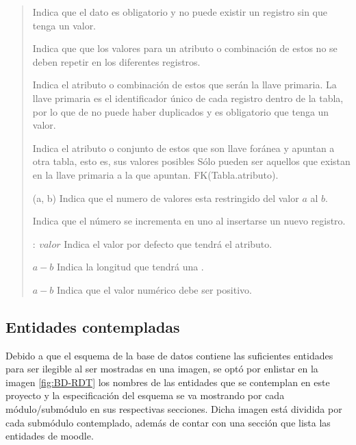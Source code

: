     \begin{quote}
    \begin{bGlosario}

            Indica que el dato es obligatorio y no puede existir un registro sin que tenga
            un valor.

            Indica que que los valores para un atributo o combinación de estos no se deben
            repetir en los diferentes registros.

            Indica el atributo o combinación de estos que serán la llave primaria. La llave
            primaria es el identificador único de cada registro dentro de la tabla, por lo
            que de no puede haber duplicados y es obligatorio que tenga un valor.

            Indica el atributo o conjunto de estos que son llave foránea y apuntan a otra
            tabla, esto es, sus valores posibles Sólo pueden ser aquellos que existan en la
            llave primaria a la que apuntan. FK(Tabla.atributo).

        (a, b)
            Indica que el numero de valores esta restringido del valor $a$ al $b$.

            Indica que el número se incrementa en uno al insertarse un nuevo registro.

         $:\ valor$
            Indica el valor por defecto que tendrá el atributo.

         $a-b$
            Indica la longitud que tendrá una .

         $a-b$
            Indica que el valor numérico debe ser positivo.
    \end{bGlosario}
    \end{quote}

\clearpage

\subsection{Entidades contempladas}

 Debido a que el esquema de la base de datos contiene las suficientes entidades para ser ilegible al ser mostradas en una imagen, se optó por
 enlistar en la imagen \ref{fig:BD-RDT} los nombres de las entidades que se contemplan en este proyecto y la especificación del esquema se va mostrando
 por cada módulo/submódulo en sus respectivas secciones. Dicha imagen está dividida por cada submódulo contemplado,
 además de contar con una sección que lista las entidades de moodle.\\


